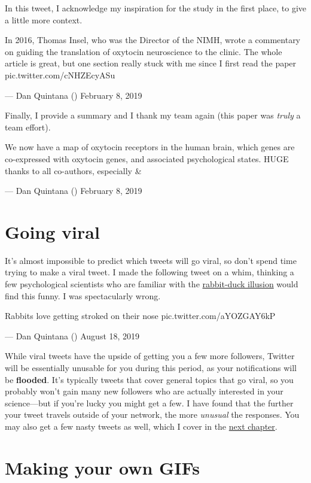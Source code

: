 \documentclass[]{book}
\begin{document}
In this tweet, I acknowledge my inspiration for the study in the first place, to give a little more context.

In 2016, Thomas Insel, who was the Director of the NIMH, wrote a commentary on guiding the translation of oxytocin neuroscience to the clinic. The whole article is great, but one section really stuck with me since I first read the paper pic.twitter.com/cNHZEcyASu

--- Dan Quintana (\citet{dsquintana}) February 8, 2019

Finally, I provide a summary and I thank my team again (this paper was \emph{truly} a team effort).

We now have a map of oxytocin receptors in the human brain, which genes are co-expressed with oxytocin genes, and associated psychological states. HUGE thanks to all co-authors, especially \citet{jarekrokicki} \& \citet{larswestlye}

--- Dan Quintana (\citet{dsquintana}) February 8, 2019

\hypertarget{going-viral}{%
\section{Going viral}\label{going-viral}}

It's almost impossible to predict which tweets will go viral, so don't spend time trying to make a viral tweet. I made the following tweet on a whim, thinking a few psychological scientists who are familiar with the \href{https://en.wikipedia.org/wiki/Rabbit\%E2\%80\%93duck_illusion}{rabbit-duck illusion} would find this funny. I was spectacularly wrong.

Rabbits love getting stroked on their nose pic.twitter.com/aYOZGAY6kP

--- Dan Quintana (\citet{dsquintana}) August 18, 2019

While viral tweets have the upside of getting you a few more followers, Twitter will be essentially unusable for you during this period, as your notifications will be \textbf{flooded}. It's typically tweets that cover general topics that go viral, so you probably won't gain many new followers who are actually interested in your science---but if you're lucky you might get a few. I have found that the further your tweet travels outside of your network, the more \emph{unusual} the responses. You may also get a few nasty tweets as well, which I cover in the \protect\hyperlink{care}{next chapter}.

\hypertarget{making-your-own-gifs}{%
\section{Making your own GIFs}\label{making-your-own-gifs}}
\end{document}
